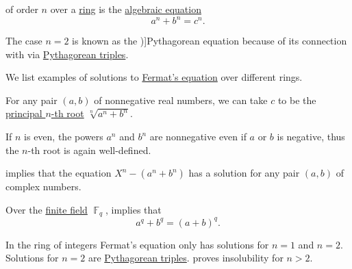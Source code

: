 \begin{definition}\label{def:fermats_equation}
   of order \( n \) over a \hyperref[def:ring]{ring} is the \hyperref[def:algebraic_equation]{algebraic equation}
  \begin{equation}\label{eq:def:fermats_equation}
    a^n + b^n = c^n.
  \end{equation}

  The case \( n = 2 \) is known as the \term[en=Pythagorean equation (\cite[\S 4.3.1]{Deza2012FigurateNumbers})]{Pythagorean equation} because of its connection with  via \hyperref[def:pythagorean_triples]{Pythagorean triples}.
\end{definition}

\begin{example}\label{ex:def:fermats_equation}
  We list examples of solutions to \hyperref[def:fermats_equation]{Fermat's equation} over different rings.
  \begin{thmenum}
     For any pair \( (a, b) \) of nonnegative real numbers, we can take \( c \) to be the \hyperref[def:principal_nonnegative_nth_root]{principal \( n \)-th root} \( \sqrt[n]{ a^n + b^n } \).

    If \( n \) is even, the powers \( a^n \) and \( b^n \) are nonnegative even if \( a \) or \( b \) is negative, thus the \( n \)-th root is again well-defined.

      implies that the equation \( X^n - (a^n + b^n) \) has a solution for any pair \( (a, b) \) of complex numbers.

     Over the \hyperref[def:finite_field]{finite field} \( \BbbF_q \),  implies that
    \begin{equation*}
      a^q + b^q = (a + b)^q.
    \end{equation*}

     In the ring of integers Fermat's equation only has solutions for \( n = 1 \) and \( n = 2 \). Solutions for \( n = 2 \) are \hyperref[def:pythagorean_triple]{Pythagorean triples}.  proves insolubility for \( n > 2 \).
  \end{thmenum}
\end{example}

